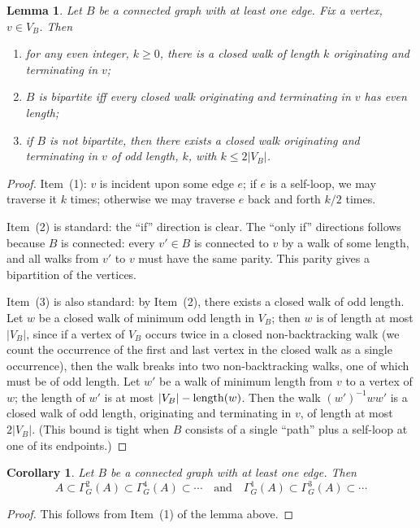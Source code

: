 \documentclass{memo-l}
\theoremstyle{plain}
\newtheorem{lemma}[theorem]{Lemma}
\newtheorem{corollary}[theorem]{Corollary}
\theoremstyle{definition}
\numberwithin{section}{chapter}
\numberwithin{equation}{chapter}
\theoremstyle{plain}
\theoremstyle{definition}
\begin{document}
\begin{lemma}\label{le:paths}
Let $B$ be a connected graph with at least one edge.  Fix a vertex,
$v\in V_B$.  Then
\begin{enumerate}
\item for any even integer, $k\ge 0$, there is a closed walk of length
$k$ originating and terminating in $v$; 
\item $B$ is bipartite iff every closed walk originating and terminating
in $v$ has even length;
\item if $B$ is not bipartite, then there exists a closed walk
originating and terminating in $v$ of odd length, $k$, with
$k\le 2|V_B|$.
\end{enumerate}
\end{lemma}
\begin{proof}
Item~(1): $v$ is incident upon some edge $e$; if $e$ is a self-loop, we
may traverse it $k$ times; otherwise we may traverse $e$ back and
forth $k/2$ times.

Item~(2) is standard:  the ``if'' direction is clear.  The ``only if''
directions follows because $B$ is connected: every $v'\in B$
is connected to $v$ by a walk of some length, and all walks from $v'$ to
$v$ must have the same parity.  This parity
gives a bipartition of the 
vertices.

Item~(3) is also standard: by Item~(2), there exists a closed walk
of odd length.
Let $w$ be a closed walk of minimum
odd length in $V_B$; then $w$ is of length at most $|V_B|$, since
if a vertex of $V_B$ occurs twice in a closed non-backtracking
walk (we count the occurrence of the first and last vertex in the closed
walk as a single occurrence), then the walk breaks into two non-backtracking
walks, one of which must be of odd length.
Let $w'$ be a walk of minimum length from $v$ to a vertex of $w$;
the length of $w'$ is at most $|V_B|-{\rm length}(w)$.
Then the walk $(w')^{-1} w w'$ is a closed walk of odd length,
originating and terminating in $v$, of length at most $2|V_B|$.
(This bound is tight when $B$ consists of a single ``path'' plus
a self-loop at one of its endpoints.)
\end{proof}

\begin{corollary}\label{co:gamma_inclusion}
Let $B$ be a connected graph with at least one edge.  Then
$$
A\subset \Gamma^2_G(A) \subset \Gamma^4_G(A) \subset \cdots
\quad\mbox{and}\quad
\Gamma^1_G(A) \subset \Gamma^3_G(A) \subset \cdots
$$
\end{corollary}
\begin{proof}
This follows from Item~(1) of the lemma above.
\end{proof}
\end{document}
